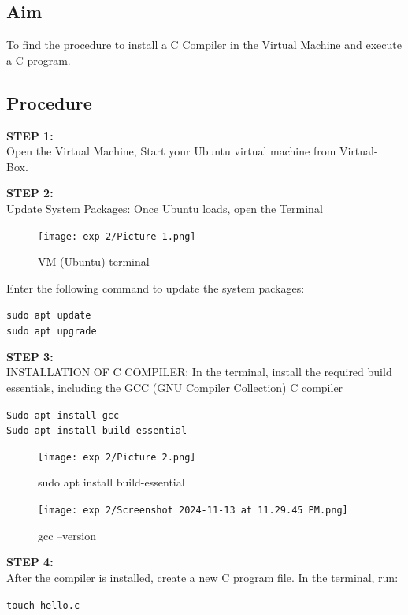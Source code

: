 \documentclass[12pt]{article}
\begin{document}
\begin{spacing}{1.5}
\begin{adjustwidth}{0cm}{0cm}
\begin{justify}
\subsection{Aim}
To find the procedure to install a C Compiler in the Virtual Machine and execute a C program.

\subsection{Procedure}

\textbf{STEP 1:} \\
Open the Virtual Machine, Start your Ubuntu virtual machine from Virtual-
Box.

\textbf{STEP 2:} \\
Update System Packages: Once Ubuntu loads, open the Terminal

\begin{figure}[H]
    \centering
    \texttt{[image: exp 2/Picture 1.png]}
    \caption{VM (Ubuntu) terminal}
    \label{fig: 1}
\end{figure}

Enter the following command to update the system packages:
\begin{center}
\parbox{\textwidth}{
\centering
\texttt{sudo apt update} \\
\texttt {sudo apt upgrade}
}
\end{center}

\textbf{STEP 3:} \\
INSTALLATION OF C COMPILER: In the terminal, install the required build essentials, including the GCC (GNU Compiler Collection) C compiler

\begin{center}
\parbox{\textwidth}{
\centering
\texttt{Sudo apt install gcc} \\
\texttt{Sudo apt install  build-essential}
}
\end{center}

\begin{figure}[H]
    \centering
    \texttt{[image: exp 2/Picture 2.png]}
    \caption{sudo apt install build-essential}
    \label{fig: 1}
\end{figure}

\begin{figure}[H]
    \centering
    \texttt{[image: exp 2/Screenshot 2024-11-13 at 11.29.45 PM.png]}
    \caption{gcc --version }
    \label{fig: 1}
\end{figure}


\textbf{STEP 4:} \\
After the compiler is installed, create a new C program file.
In the terminal, run:
\begin{center}
\parbox{\textwidth}{
\centering
\texttt{touch hello.c}
}
\end{center}


\end{justify}
\end{adjustwidth}
\end{spacing}
\end{document}

